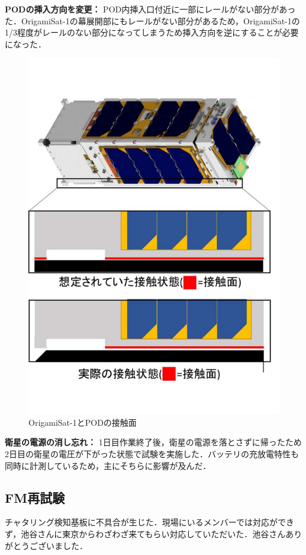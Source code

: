 \textbf{PODの挿入方向を変更：}
POD内挿入口付近に一部にレールがない部分があった．OrigamiSat-1の幕展開部にもレールがない部分があるため，OrigamiSat-1の1/3程度がレールのない部分になってしまうため挿入方向を逆にすることが必要になった．
\begin{figure}[H]
	\centering
	\includegraphics[width=0.7\linewidth]{04/fig/4-3-7.pdf}
	\caption{OrigamiSat-1とPODの接触面}
	\label{fig4-3-1}
\end{figure}



\textbf{衛星の電源の消し忘れ：}
1日目作業終了後，衛星の電源を落とさずに帰ったため2日目の衛星の電圧が下がった状態で試験を実施した．バッテリの充放電特性も同時に計測しているため，主にそちらに影響が及んだ．

\subsection{FM再試験}
チャタリング検知基板に不具合が生じた．現場にいるメンバーでは対応ができず，池谷さんに東京からわざわざ来てもらい対応していただいた．池谷さんありがとうございました．

